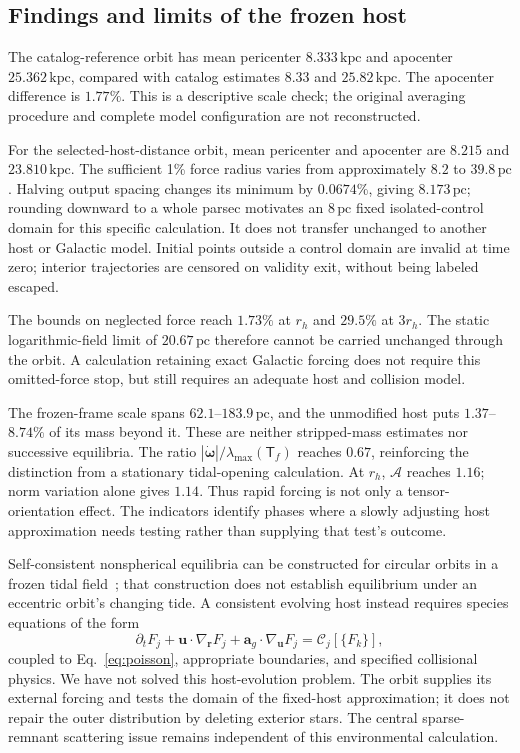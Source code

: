 \documentclass[aps,prd,reprint,amsmath,amssymb,superscriptaddress,nofootinbib,longbibliography,floatfix]{revtex4-2}
\begin{document}
\subsection{Findings and limits of the frozen host}

The catalog-reference orbit has mean pericenter $8.333\,\mathrm{kpc}$ and apocenter $25.362\,\mathrm{kpc}$, compared with catalog estimates $8.33$ and $25.82\,\mathrm{kpc}$. The apocenter difference is $1.77\%$. This is a descriptive scale check; the original averaging procedure and complete model configuration are not reconstructed.

For the selected-host-distance orbit, mean pericenter and apocenter are $8.215$ and $23.810\,\mathrm{kpc}$. The sufficient 1\% force radius varies from approximately $8.2$ to $39.8\,\mathrm{pc}$. Halving output spacing changes its minimum by $0.0674\%$, giving $8.173\,\mathrm{pc}$; rounding downward to a whole parsec motivates an $8\,\mathrm{pc}$ fixed isolated-control domain for this specific calculation. It does not transfer unchanged to another host or Galactic model. Initial points outside a control domain are invalid at time zero; interior trajectories are censored on validity exit, without being labeled escaped.

The bounds on neglected force reach $1.73\%$ at $r_h$ and $29.5\%$ at $3r_h$. The static logarithmic-field limit of $20.67\,\mathrm{pc}$ therefore cannot be carried unchanged through the orbit. A calculation retaining exact Galactic forcing does not require this omitted-force stop, but still requires an adequate host and collision model.

The frozen-frame scale spans $62.1$--$183.9\,\mathrm{pc}$, and the unmodified host puts $1.37$--$8.74\%$ of its mass beyond it. These are neither stripped-mass estimates nor successive equilibria. The ratio $|\dot{\boldsymbol\omega}|/\lambda_{\max}(\mathsf T_f)$ reaches $0.67$, reinforcing the distinction from a stationary tidal-opening calculation. At $r_h$, $\mathcal A$ reaches $1.16$; norm variation alone gives $1.14$. Thus rapid forcing is not only a tensor-orientation effect. The indicators identify phases where a slowly adjusting host approximation needs testing rather than supplying that test's outcome.

Self-consistent nonspherical equilibria can be constructed for circular orbits in a frozen tidal field~\cite{Bertin2008}; that construction does not establish equilibrium under an eccentric orbit's changing tide. A consistent evolving host instead requires species equations of the form
\begin{equation}
\partial_t F_j+\mathbf u\cdot\nabla_{\mathbf r}F_j
+\mathbf a_g\cdot\nabla_{\mathbf u}F_j=\mathcal C_j[\{F_k\}],
\label{eq:host-evolution}
\end{equation}
coupled to Eq.~\eqref{eq:poisson}, appropriate boundaries, and specified collisional physics. We have not solved this host-evolution problem. The orbit supplies its external forcing and tests the domain of the fixed-host approximation; it does not repair the outer distribution by deleting exterior stars. The central sparse-remnant scattering issue remains independent of this environmental calculation.
\end{document}
